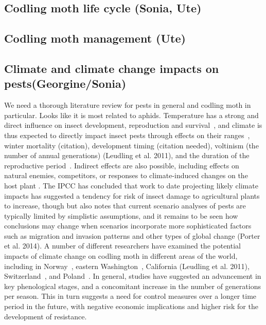 \documentclass[12pt]{article}
\theoremstyle{plain}
\theoremstyle{definition}
\theoremstyle{definition}
\begin{document}
\subsection{Codling moth life cycle (Sonia, Ute)}


\subsection{Codling moth management (Ute)}


\subsection{Climate and climate change impacts on pests(Georgine/Sonia)}


We need a thorough literature review for pests in general 
and codling moth in particular. Looks like it is most related to aphids. 
Temperature has a strong and direct influence on insect 
development, reproduction and survival~\cite{Bale2002_451},
and climate is thus expected to directly impact insect pests 
through effects on their ranges~\cite{Jaramillo_2009, Estay_01380}, 
winter mortality (citation), development timing (citation needed), 
voltinism (the number of annual generations) \cite{Altermatt_Florian}(Leudling et al. 2011), 
and the duration of the reproductive period~\cite{van_Asch}. 
Indirect effects are also possible, including effects on natural enemies, 
competitors, or responses to climate-induced changes on the host plant 
\cite{Bale2002_451, Gregory_2009}. The IPCC has concluded that 
work to date projecting likely climate impacts has suggested a tendency 
for risk of insect damage to agricultural plants to increase, though but 
also notes that current scenario analyses of pests are typically limited 
by simplistic assumptions, and it remains to be seen how conclusions 
may change when scenarios incorporate more sophisticated factors such 
as migration and invasion patterns and other types of global change 
(Porter et al. 2014).
A number of different researchers have examined the potential 
impacts of climate change on codling moth in different areas of 
the world, including in Norway~\cite{Rafoss_Trond}, eastern 
Washington~\cite{Nelson_higgins}, California (Leudling et al. 2011), 
Switzerland~\cite{Stoeckli_2012}, and Poland~\cite{Juszczak2013}.  
In general, studies have suggested an advancement in key 
phenological stages, and a concomitant increase in the 
number of generations per season. This in turn suggests 
a need for control measures over a longer time period in 
the future, with negative economic implications and higher 
risk for the development of resistance.
\end{document}
